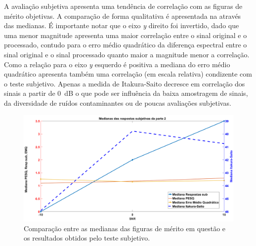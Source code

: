 A avaliação subjetiva apresenta uma tendência de correlação com as figuras de mérito objetivas. A comparação de forma qualitativa é apresentada na  através das medianas. É importante notar que o eixo \textit{y} direito foi invertido, dado que uma menor magnitude apresenta uma maior correlação entre o sinal original e o processado, contudo para o erro médio quadrático da diferença espectral entre o sinal original e o sinal processado quanto maior a magnitude menor a correlação. Como a relação para o eixo \textit{y} esquerdo é positiva a mediana do erro médio quadrático apresenta também uma correlação (em escala relativa) condizente com o teste subjetivo. Apenas a medida de Itakura-Saito decresce em correlação dos sinais a partir de 0~dB o que pode ser influência da baixa amostragem de sinais, da diversidade de ruídos contaminantes ou de poucas avaliações subjetivas. 



\begin{figure}[H]
\centering
\includegraphics[width=1\linewidth]{Figs/parte2}
\caption{Comparação entre as medianas das figuras de mérito em questão e os resultados obtidos pelo teste subjetivo.}
\label{parte2}
\end{figure}

